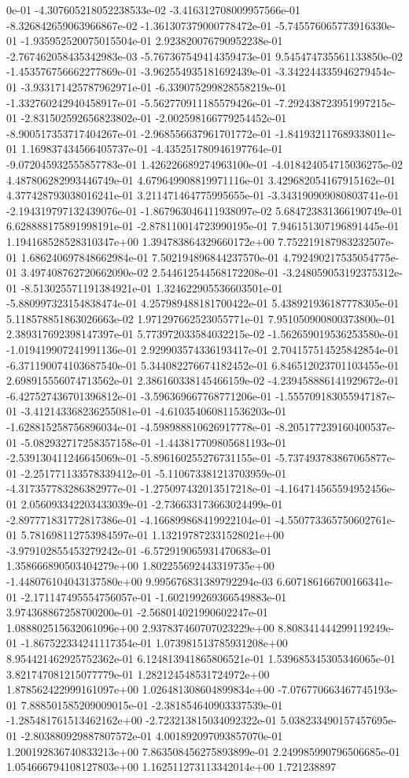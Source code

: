 0e-01	-4.307605218052238533e-02	-3.416312708009957566e-01	-8.326842659063966867e-02	-1.361307379000778472e-01	-5.745576065773916330e-01	-1.935952520075015504e-01	2.923820076790952238e-01	-2.767462058435342983e-03	-5.767367549414359473e-01	9.545474735561133850e-02	-1.453576756662277869e-01	-3.962554935181692439e-01	-3.342244335946279454e-01	-3.933171425787962971e-01	-6.339075299828558219e-01	-1.332760242940458917e-01	-5.562770911185579426e-01	-7.292438723951997215e-01	-2.831502592656823802e-01	-2.002598166779254452e-01	-8.900517353717404267e-01	-2.968556637961701772e-01	-1.841932117689338011e-01	1.169837434566405737e-01	-4.435251780946197764e-01	-9.072045932555857783e-01	1.426226689274963100e-01	-4.018424054715036275e-02	4.487806282993446749e-01	4.679649908819971116e-01	3.429682054167915162e-01	4.377428793038016241e-01	3.211471464775995655e-01	-3.343190909080803741e-01	-2.194319797132439076e-01	-1.867963046411938097e-02	5.684723831366190749e-01	6.628888175891998191e-01	-2.878110014723990195e-01	7.946151307196891445e-01	1.194168528528310347e+00	1.394783864329660172e+00	7.752219187983232507e-01	1.686240697848662984e-01	7.502194896844237570e-01	4.792490217535054775e-01	3.497408762720662090e-02	2.544612544568172208e-01	-3.248059053192375312e-01	-8.513025571191384921e-01	1.324622905536603501e-01	-5.880997323154838474e-01	4.257989488181700422e-01	5.438921936187778305e-01	5.118578851863026663e-02	1.971297662523055771e-01	7.951050900800373800e-01	2.389317692398147397e-01	5.773972033584032215e-02	-1.562659019536253580e-01	-1.019419907241991136e-01	2.929903574336193417e-01	2.704157514525842854e-01	-6.371190074103687540e-01	5.344082276674182452e-01	6.846512023701103455e-01	2.698915556074713562e-01	2.386160338145466159e-02	-4.239458886141929672e-01	-6.427527436701396812e-01	-3.596369667768771206e-01	-1.555709183055947187e-01	-3.412143368236255081e-01	-4.610354060811536203e-01	-1.628815258756896034e-01	-4.598988810626917778e-01	-8.205177239160400537e-01	-5.082932717258357158e-01	-1.443817709805681193e-01	-2.539130411246645069e-01	-5.896160255276731155e-01	-5.737493783867065877e-01	-2.251771133578339412e-01	-5.110673381213703959e-01	-4.317357783286382977e-01	-1.275097432013517218e-01	-4.164714565594952456e-01	2.056093342203433039e-01	-2.736633173663024499e-01	-2.897771831772817386e-01	-4.166899868419922104e-01	-4.550773365750602761e-01	5.781698112753984597e-01	1.132197872331528021e+00	-3.979102855453279242e-01	-6.572919065931470683e-01	1.358666890503404279e+00	1.802255692443319735e+00	-1.448076104043137580e+00	9.995676831389792294e-03	6.607186166700166341e-01	-2.171147495554756057e-01	-1.602199269366549883e-01	3.974368867258700200e-01	-2.568014021990602247e-01	1.088802515632061096e+00	2.937837460707023229e+00	8.808341444299119249e-01	-1.867522334241117354e-01	1.073981513785931208e+00	8.954421462925752362e-01	6.124813941865806521e-01	1.539685345305346065e-01	3.821747081215077779e-01	1.282124548531724972e+00	1.878562422999161097e+00	1.026481308604899834e+00	-7.076770663467745193e-01	7.888501585209009015e-01	-2.381854640903337539e-01	-1.285481761513462162e+00	-2.723213815034092322e-01	5.038233490157457695e-01	-2.803880929887807572e-01	4.001892097093857070e-01	1.200192836740833213e+00	7.863508456275893899e-01	2.249985990796506685e-01	1.054666794108127803e+00	1.162511273113342014e+00	1.721238897